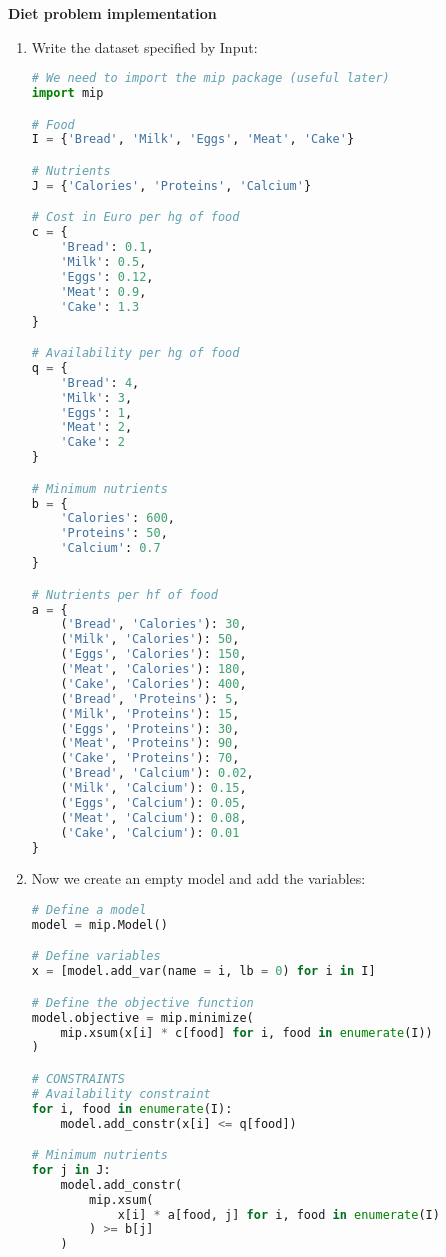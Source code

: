 \highspace
\begin{flushleft}
    \textcolor{Green3}{ \textbf{Diet problem implementation}}
\end{flushleft}

\begin{enumerate}
    \item Write the dataset specified by Input:
    \begin{lstlisting}[language=Python]
# We need to import the mip package (useful later)
import mip

# Food
I = {'Bread', 'Milk', 'Eggs', 'Meat', 'Cake'}

# Nutrients
J = {'Calories', 'Proteins', 'Calcium'}

# Cost in Euro per hg of food
c = {
    'Bread': 0.1, 
    'Milk': 0.5, 
    'Eggs': 0.12,
    'Meat': 0.9,
    'Cake': 1.3
}

# Availability per hg of food
q = {
    'Bread': 4,
    'Milk': 3,
    'Eggs': 1,
    'Meat': 2,
    'Cake': 2
}

# Minimum nutrients 
b = {
    'Calories': 600,
    'Proteins': 50,
    'Calcium': 0.7
}

# Nutrients per hf of food
a = {
    ('Bread', 'Calories'): 30,
    ('Milk', 'Calories'): 50,
    ('Eggs', 'Calories'): 150,
    ('Meat', 'Calories'): 180,
    ('Cake', 'Calories'): 400,
    ('Bread', 'Proteins'): 5,
    ('Milk', 'Proteins'): 15,
    ('Eggs', 'Proteins'): 30,
    ('Meat', 'Proteins'): 90,
    ('Cake', 'Proteins'): 70,
    ('Bread', 'Calcium'): 0.02,
    ('Milk', 'Calcium'): 0.15,
    ('Eggs', 'Calcium'): 0.05,
    ('Meat', 'Calcium'): 0.08,
    ('Cake', 'Calcium'): 0.01
}\end{lstlisting}

    \item Now we create an empty model and add the variables:
    \begin{lstlisting}[language=Python]
# Define a model
model = mip.Model()

# Define variables
x = [model.add_var(name = i, lb = 0) for i in I]

# Define the objective function
model.objective = mip.minimize(
    mip.xsum(x[i] * c[food] for i, food in enumerate(I))
)

# CONSTRAINTS
# Availability constraint
for i, food in enumerate(I):
    model.add_constr(x[i] <= q[food])

# Minimum nutrients
for j in J:
    model.add_constr(
        mip.xsum(
            x[i] * a[food, j] for i, food in enumerate(I)
        ) >= b[j]
    )\end{lstlisting}


\end{enumerate}
